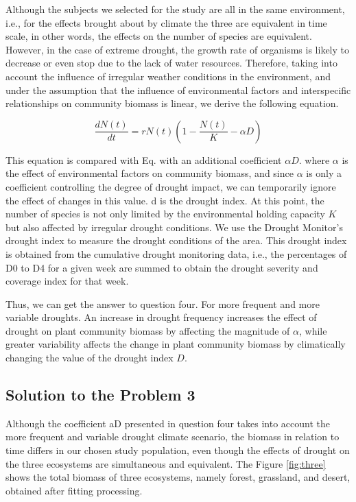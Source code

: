 \documentclass[12pt]{article}
\begin{document}
Although the subjects we selected for the study are all in the same environment, i.e., for the effects brought about by climate the three are equivalent in time scale, in other words, the effects on the number of species are equivalent. However, in the case of extreme drought, the growth rate of organisms is likely to decrease or even stop due to the lack of water resources. Therefore, taking into account the influence of irregular weather conditions in the environment, and under the assumption that the influence of environmental factors and interspecific relationships on community biomass is linear, we derive the following equation.

\begin{equation}
	\frac{dN(t)}{dt} = rN(t)(1-\frac{N(t)}{K} - \alpha D)
\end{equation}

This equation is compared with Eq. with an additional coefficient $\alpha D$. where $\alpha$ is the effect of environmental factors on community biomass, and since $\alpha$ is only a coefficient controlling the degree of drought impact, we can temporarily ignore the effect of changes in this value. d is the drought index. At this point, the number of species is not only limited by the environmental holding capacity $K$ but also affected by irregular drought conditions. We use the Drought Monitor's drought index to measure the drought conditions of the area. This drought index is obtained from the cumulative drought monitoring data, i.e., the percentages of D0 to D4 for a given week are summed to obtain the drought severity and coverage index for that week.

Thus, we can get the answer to question four. For more frequent and more variable droughts. An increase in drought frequency increases the effect of drought on plant community biomass by affecting the magnitude of $\alpha$, while greater variability affects the change in plant community biomass by climatically changing the value of the drought index $D$.

\subsection{Solution to the Problem 3}

Although the coefficient aD presented in question four takes into account the more frequent and variable drought climate scenario, the biomass in relation to time differs in our chosen study population, even though the effects of drought on the three ecosystems are simultaneous and equivalent. The Figure \ref{fig:three} shows the total biomass of three ecosystems, namely forest, grassland, and desert, obtained after fitting processing.
\end{document}
